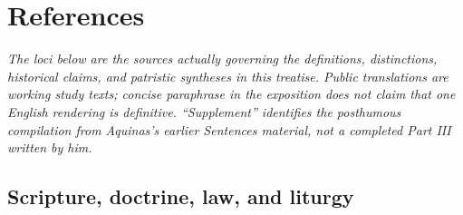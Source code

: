 \section{References}

\noindent\emph{The loci below are the sources actually governing the definitions, distinctions, historical claims, and patristic syntheses in this treatise. Public translations are working study texts; concise paraphrase in the exposition does not claim that one English rendering is definitive. ``Supplement'' identifies the posthumous compilation from Aquinas's earlier Sentences material, not a completed Part III written by him.}

\subsection*{Scripture, doctrine, law, and liturgy}
